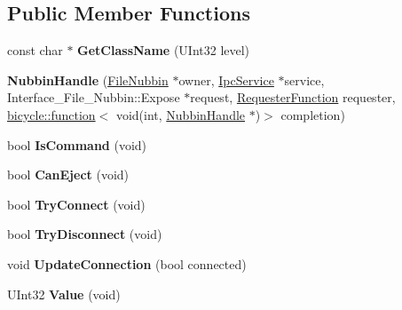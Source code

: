 \subsection*{Public Member Functions}
\begin{DoxyCompactItemize}
\item 
\mbox{\label{class_nubbin_handle_a923a5ccbb2e6b98d1ee432b79ae74f32}} 
const char $\ast$ {\bfseries Get\+Class\+Name} (U\+Int32 level)
\item 
\mbox{\label{class_nubbin_handle_af22496ca2e2944ddd6797b93c0b0d5fe}} 
{\bfseries Nubbin\+Handle} (\hyperlink{class_file_nubbin}{File\+Nubbin} $\ast$owner, \hyperlink{class_ipc_service}{Ipc\+Service} $\ast$service, Interface\+\_\+\+File\+\_\+\+Nubbin\+::\+Expose $\ast$request, \hyperlink{classbicycle_1_1function}{Requester\+Function} requester, \hyperlink{classbicycle_1_1function}{bicycle\+::function}$<$ void(int, \hyperlink{class_nubbin_handle}{Nubbin\+Handle} $\ast$)$>$ completion)
\item 
\mbox{\label{class_nubbin_handle_a4469361fbeaea7d948d40a0fda5caf93}} 
bool {\bfseries Is\+Command} (void)
\item 
\mbox{\label{class_nubbin_handle_a489168b0513c919a8436e07569383d53}} 
bool {\bfseries Can\+Eject} (void)
\item 
\mbox{\label{class_nubbin_handle_a53624c3d7b49476ad02be85c960495c4}} 
bool {\bfseries Try\+Connect} (void)
\item 
\mbox{\label{class_nubbin_handle_a120d1bb12c14545b8dfe8d2e38b56fdd}} 
bool {\bfseries Try\+Disconnect} (void)
\item 
\mbox{\label{class_nubbin_handle_a3bb5f781d13b3bcd12201346feb6b77d}} 
void {\bfseries Update\+Connection} (bool connected)
\item 
\mbox{\label{class_nubbin_handle_a250464dda4347b339662340bac85d8a4}} 
U\+Int32 {\bfseries Value} (void)
\end{DoxyCompactItemize}
